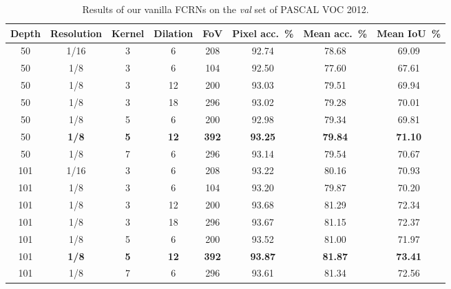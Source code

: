 \documentclass{article}
\begin{document}
\begin{table}[t]
\caption{Results of our vanilla FCRNs on the \emph{val} set of PASCAL VOC 2012.}
\label{tbl:fcrn voc val}
\centering
\small
\begin{tabular}{ccccc|ccc}
\toprule
Depth & Resolution & Kernel & Dilation & FoV & Pixel acc.~\% & Mean acc.~\% & Mean IoU~\% \\
\hline\hline
50 & 1/16 & 3 & 6 & 208 & 92.74 & 78.68 & 69.09 \\
50 & 1/8 & 3 & 6 & 104 & 92.50 & 77.60 & 67.61 \\
50 & 1/8 & 3 & 12 & 200 & 93.03 & 79.51 & 69.94 \\
50 & 1/8 & 3 & 18 & 296 & 93.02 & 79.28 & 70.01 \\
50 & 1/8 & 5 & 6 & 200 & 92.98 & 79.34 & 69.81 \\
50 & \textbf{1/8} & \textbf{5} & \textbf{12} & \textbf{392} & \textbf{93.25} & \textbf{79.84} & \textbf{71.10} \\
50 & 1/8 & 7 & 6 & 296 & 93.14 & 79.54 & 70.67 \\
\hline\hline
101 & 1/16 & 3 & 6 & 208 & 93.22 & 80.16 & 70.93 \\
101 & 1/8 & 3 & 6 & 104 & 93.20 & 79.87 & 70.20 \\
101 & 1/8 & 3 & 12 & 200 & 93.68 & 81.29 & 72.34 \\
101 & 1/8 & 3 & 18 & 296 & 93.67 & 81.15 & 72.37 \\
101 & 1/8 & 5 & 6 & 200 & 93.52 & 81.00 & 71.97 \\
101 & \textbf{1/8} & \textbf{5} & \textbf{12} & \textbf{392} & \textbf{93.87} & \textbf{81.87} & \textbf{73.41} \\
101 & 1/8 & 7 & 6 & 296 & 93.61 & 81.34 & 72.56 \\
\bottomrule
\end{tabular}
\end{table}
\end{document}
